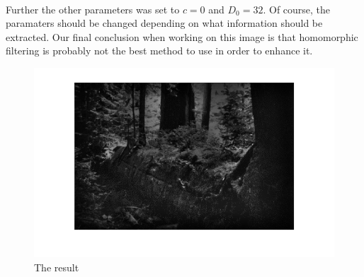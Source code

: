 		\\
		Further the other parameters was set to $c = 0$ and $D_0 = 32$. Of course,
		the paramaters should be changed depending on what information should be extracted.
		Our final conclusion when working on this image is that homomorphic filtering
		is probably not the best method to use in order to enhance it.
		\begin{figure}[h!]
			\includegraphics{pics/resulting_image.png}
			\caption{The result}
			\label{fig:result}		
		\end{figure}
							    
